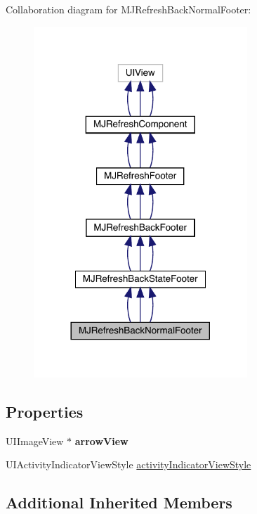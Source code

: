 Collaboration diagram for M\+J\+Refresh\+Back\+Normal\+Footer\+:\nopagebreak
\begin{figure}[H]
\begin{center}
\leavevmode
\includegraphics[width=228pt]{interface_m_j_refresh_back_normal_footer__coll__graph}
\end{center}
\end{figure}
\subsection*{Properties}
\begin{DoxyCompactItemize}
\item 
\mbox{\label{interface_m_j_refresh_back_normal_footer_a3dab9f19267aa64fb6984702d0531bf1}} 
U\+I\+Image\+View $\ast$ {\bfseries arrow\+View}
\item 
U\+I\+Activity\+Indicator\+View\+Style \mbox{\hyperlink{interface_m_j_refresh_back_normal_footer_a059ec7ba7f7e7c6ee520b88c24356771}{activity\+Indicator\+View\+Style}}
\end{DoxyCompactItemize}
\subsection*{Additional Inherited Members}


